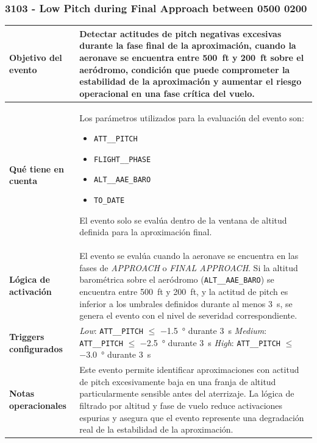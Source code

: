 \documentclass[11pt,a4paper]{article}
\begin{document}
	\subsubsection{3103 - Low Pitch during Final Approach between 0500 0200}
	
	\begin{longtable}{p{5cm} p{9.5cm}}
		\hline
		\textbf{Objetivo del evento} &
		Detectar actitudes de pitch negativas excesivas durante la fase final de la aproximación, cuando la aeronave se encuentra entre \SI{500}{ft} y \SI{200}{ft} sobre el aeródromo, condición que puede comprometer la estabilidad de la aproximación y aumentar el riesgo operacional en una fase crítica del vuelo. \\
		\hline
		
		\textbf{Qué tiene en cuenta} &
		Los parámetros utilizados para la evaluación del evento son:
		\begin{itemize}
			\item \texttt{ATT\_\_PITCH}
			\item \texttt{FLIGHT\_\_PHASE}
			\item \texttt{ALT\_\_AAE\_BARO}
			\item \texttt{TO\_DATE}
		\end{itemize}
		El evento solo se evalúa dentro de la ventana de altitud definida para la aproximación final. \\
		\hline
		
		\textbf{Lógica de activación} &
		El evento se evalúa cuando la aeronave se encuentra en las fases de \textit{APPROACH} o \textit{FINAL APPROACH}.  
		Si la altitud barométrica sobre el aeródromo (\texttt{ALT\_\_AAE\_BARO}) se encuentra entre \SI{500}{ft} y \SI{200}{ft}, y la actitud de pitch es inferior a los umbrales definidos durante al menos \SI{3}{s}, se genera el evento con el nivel de severidad correspondiente. \\
		\hline
		
		\textbf{Triggers configurados} &
		\textit{Low}: \texttt{ATT\_\_PITCH} $\leq$ \SI{-1.5}{\degree} durante \SI{3}{s} \newline
		\textit{Medium}: \texttt{ATT\_\_PITCH} $\leq$ \SI{-2.5}{\degree} durante \SI{3}{s} \newline
		\textit{High}: \texttt{ATT\_\_PITCH} $\leq$ \SI{-3.0}{\degree} durante \SI{3}{s} \\
		\hline
		
		\textbf{Notas operacionales} &
		Este evento permite identificar aproximaciones con actitud de pitch excesivamente baja en una franja de altitud particularmente sensible antes del aterrizaje.  
		La lógica de filtrado por altitud y fase de vuelo reduce activaciones espurias y asegura que el evento represente una degradación real de la estabilidad de la aproximación. \\
		\hline
	\end{longtable}
	
\end{document}

